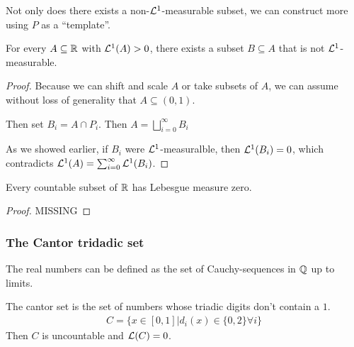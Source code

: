 Not only does there exists a non-$\mathcal{L}^{1}$-measurable subset, we can construct more using $P$ as a ``template''.

\begin{prop}[]
  For every $A \subseteq \mathbb{R}$ with $\mathcal{L}^{1}(A) > 0$, there exists a subset $B \subseteq A$ that is not $\mathcal{L}^{1}$-measurable.
\end{prop}
\begin{proof}
  Because we can shift and scale $A$ or take subsets of $A$, we can assume without loss of generality that $A \subseteq (0,1)$.

  Then set $B_i = A \cap P_i$. Then $A = \bigsqcup_{i=0}^{\infty}B_i$

  As we showed earlier, if $B_i$ were $\mathcal{L}^{1}$-measuralble, then $\mathcal{L}^{1}(B_i) = 0$, which contradicts $\mathcal{L}^{1}(A) = \sum_{i=0}^{\infty} \mathcal{L}^{1}(B_i)$.
\end{proof}

\begin{prop}[]
  Every countable subset of $\mathbb{R}$ has Lebesgue measure zero.
\end{prop}
\begin{proof}
MISSING
\end{proof}




\subsubsection*{The Cantor tridadic set}

The real numbers can be defined as the set of Cauchy-sequences in $\mathbb{Q}$ up to limits.

The cantor set is the set of numbers whose triadic digits don't contain a $1$.
\begin{align*}
  C = \{x \in [0,1] \big\vert d_i(x) \in \{0,2\} \forall i\}
\end{align*}
Then $C$ is uncountable and $\mathcal{L}(C) = 0$.


